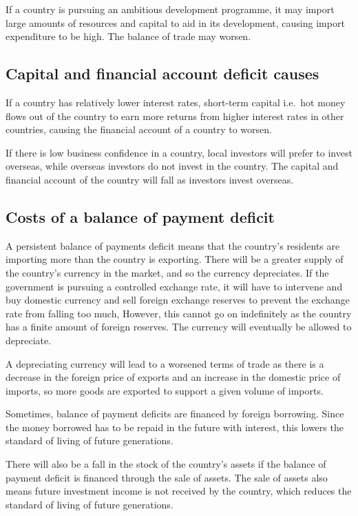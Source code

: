 \documentclass[Economics.tex]{subfiles}
\begin{document}
If a country is pursuing an ambitious development programme, it may import large amounts of resources and capital to aid in its development, causing import expenditure to be high. The balance of trade may worsen.
\subsection{Capital and financial account deficit causes}
If a country has relatively lower interest rates, short-term capital i.e.\ hot money flows out of the country to earn more returns from higher interest rates in other countries, causing the financial account of a country to worsen.

If there is low business confidence in a country, local investors will prefer to invest overseas, while overseas investors do not invest in the country. The capital and financial account of the country will fall as investors invest overseas.
\subsection{Costs of a balance of payment deficit}
A persistent balance of payments deficit means that the country's residents are importing more than the country is exporting. There will be a greater supply of the country's currency in the market, and so the currency depreciates. If the government is pursuing a controlled exchange rate, it will have to intervene and buy domestic currency and sell foreign exchange reserves to prevent the exchange rate from falling too much, However, this cannot go on indefinitely as the country has a finite amount of foreign reserves. The currency will eventually be allowed to depreciate.

A depreciating currency will lead to a worsened terms of trade as there is a decrease in the foreign price of exports and an increase in the domestic price of imports, so more goods are exported to support a given volume of imports.

Sometimes, balance of payment deficits are financed by foreign borrowing. Since the money borrowed has to be repaid in the future with interest, this lowers the standard of living of future generations.

There will also be a fall in the stock of the country's assets if the balance of payment deficit is financed through the sale of assets. The sale of assets also means future investment income is not received by the country, which reduces the standard of living of future generations.
\end{document}

